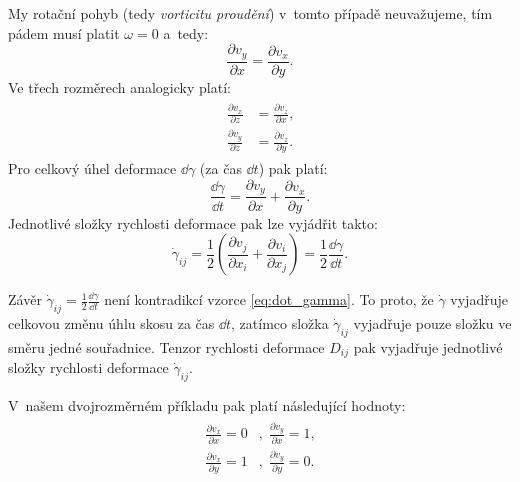 \documentclass[12pt]{article}
\begin{document}
My rotační pohyb (tedy \emph{vorticitu proudění}) v~tomto případě neuvažujeme, tím pádem musí platit $\omega = 0$ a~tedy:
\begin{equation}
    \frac{\partial v_y}{\partial x} = \frac{\partial v_x}{\partial y}\text{.}
\end{equation}
Ve třech rozměrech analogicky platí:
\begin{align}
    \begin{split}
        \frac{\partial v_x}{\partial z} &= \frac{\partial v_z}{\partial x}\text{,}\\
        \frac{\partial v_y}{\partial z} &= \frac{\partial v_z}{\partial y}\text{.}
    \end{split}
\end{align}
Pro celkový úhel deformace $\dd\gamma$ (za čas $\dd t$) pak platí:
\begin{equation}
    \frac{\dd\gamma}{\dd t} = \frac{\partial v_y}{\partial x} + \frac{\partial v_x}{\partial y}\text{.}
    \label{eq:gradient_gamma}
\end{equation}
Jednotlivé složky rychlosti deformace pak lze vyjádřit takto:~\cite{online:Skripta_rychlost_deformace}\cite{wiki:Simple_shear}\cite{wiki:Infinitesimal_strain_theory}\cite{wiki:Deformace}
\begin{equation}
    \dot\gamma_{ij} = \frac{1}{2}\left(\frac{\partial v_j}{\partial x_i} + \frac{\partial v_i}{\partial x_j}\right) = \frac{1}{2}\frac{\dd\gamma}{\dd t}\text{.}
    \label{eq:rychlost_deformace}
\end{equation}
\par
Závěr $\dot\gamma_{ij} = \frac{1}{2}\frac{\dd\gamma}{\dd t}$ není kontradikcí vzorce \ref{eq:dot_gamma}. To proto, že $\dot\gamma$ vyjadřuje celkovou změnu úhlu skosu za čas $\dd t$, zatímco složka $\dot\gamma_{ij}$ vyjadřuje pouze složku ve směru jedné souřadnice. Tenzor rychlosti deformace $D_{ij}$ pak vyjadřuje jednotlivé složky rychlosti deformace $\dot\gamma_{ij}$.~\cite{YT:Kinematics_of_fluids_elements}\cite{online:Skripta_deformace}\cite{online:Skripta_viskozni_latky}\cite{wiki:Strain_mechanics}\cite{wiki:Infinitesimal_strain_theory}\cite{wiki:Simple_shear}
\par
V~našem dvojrozměrném příkladu pak platí následující hodnoty:
\begin{align}
    \begin{split}
        \frac{\partial v_x}{\partial x} = 0&, \;
        \frac{\partial v_y}{\partial x} = 1 \text{,}\\
        \frac{\partial v_x}{\partial y} = 1&, \;
        \frac{\partial v_y}{\partial y} = 0 \text{.}
    \end{split}
\end{align}
\end{document}
